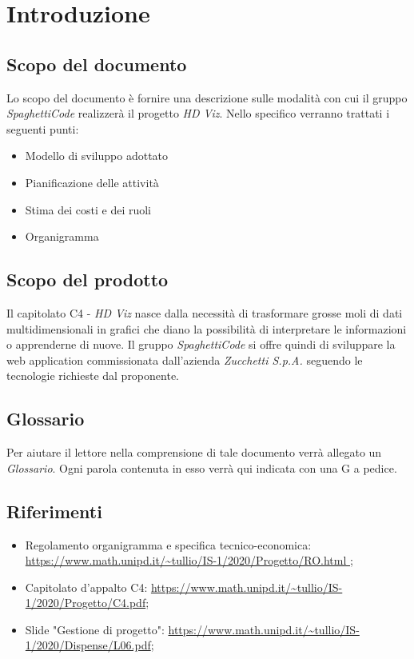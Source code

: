 \documentclass{article}
\begin{document}


\section{Introduzione}%
\label{sec:introduzione}

\subsection{Scopo del documento}%
\label{sub:scopo_del_documento}
Lo scopo del documento è fornire una descrizione sulle modalità con cui il gruppo \emph{SpaghettiCode} realizzerà il progetto \emph{HD Viz}. Nello specifico verranno trattati i seguenti punti:
\begin{itemize}
  \item Modello di sviluppo adottato
  \item Pianificazione delle attività
  \item Stima dei costi e dei ruoli
  \item Organigramma 
\end{itemize}

\subsection{Scopo del prodotto}%
\label{sub:scopo_prodotto}
Il capitolato C4 - \emph{HD Viz} nasce dalla necessità di trasformare grosse moli di dati multidimensionali in grafici che diano la possibilità di interpretare le informazioni o apprenderne di nuove. Il gruppo \emph{SpaghettiCode} si offre quindi di sviluppare la web application commissionata dall’azienda \emph{Zucchetti S.p.A.} seguendo le tecnologie richieste dal proponente. 


\subsection{Glossario}%
\label{sub:glossario}
Per aiutare il lettore nella comprensione di tale documento verrà allegato un \emph{Glossario}. Ogni parola contenuta in esso verrà qui indicata con una G a pedice.


\subsection{Riferimenti}%
\label{sub:riferimenti}
\begin{itemize}
  \item Regolamento organigramma e specifica tecnico-economica: \url{https://www.math.unipd.it/~tullio/IS-1/2020/Progetto/RO.html };
  \item Capitolato d’appalto C4: \url{https://www.math.unipd.it/~tullio/IS-1/2020/Progetto/C4.pdf};
  \item Slide "Gestione di progetto": \url{https://www.math.unipd.it/~tullio/IS-1/2020/Dispense/L06.pdf};
\end{itemize}
\end{document}
